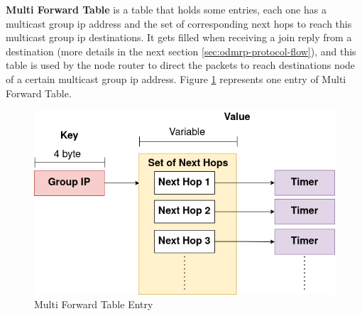 \textbf{Multi Forward Table} is a table that holds some entries, each one has a multicast group \acrshort{ip} address and the set of corresponding next hops to reach this multicast group \acrshort{ip} destinations. It gets filled when receiving a join reply from a destination (more details in the next section \ref{sec:odmrp-protocol-flow}), and this table is used by the node router to direct the packets to reach destinations node of a certain multicast group \acrshort{ip} address.
Figure \ref{fig:multi-forward-table-entry} represents one entry of Multi Forward Table.
\begin{figure}[!htbp]
    \centering
    \includegraphics[width=\linewidth]{images/multi-forward-table-entry.png}
    \caption{Multi Forward Table Entry}
    \label{fig:multi-forward-table-entry}
\end{figure}
\\
\\
\\
\\
\\
\\
